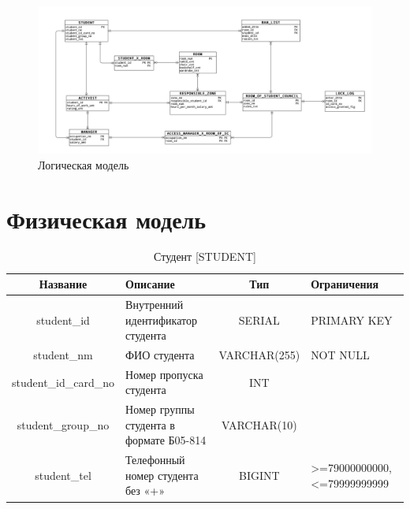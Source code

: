 \documentclass[a4paper,]{article}
\begin{document}
\begin{figure}[H]
    \centering
	\begin{center}
	\includegraphics[width=12cm]{media/logic.jpeg}
	\caption{Логическая модель}
	\label{figure:logic}
	\end{center}
\end{figure}

\pagebreak

\section{Физическая модель}

\begin{table}[H]
    \footnotesize
	\center
	\begin{tabular}[center]{|c|p{4cm}|c|p{3cm}|}
        \hline
		Название & Описание & Тип & Ограничения \\ \hline
		student\_id & Внутренний идентификатор студента & SERIAL & PRIMARY KEY \\ \hline
		student\_nm & ФИО студента & VARCHAR(255) & NOT NULL \\ \hline
		student\_id\_card\_no & Номер пропуска студента & INT & \\ \hline
		student\_group\_no & Номер группы студента в формате Б05-814 & VARCHAR(10) &\\ \hline
		student\_tel & Телефонный номер студента без «+» & BIGINT & >=79000000000,  <=79999999999 \\ \hline
	\end{tabular}
	\caption{Студент [STUDENT]}
\end{table}
\end{document}
